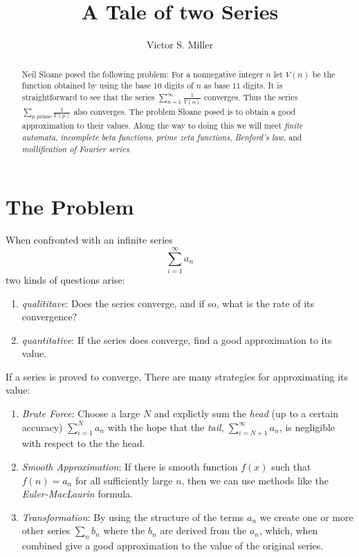 \documentclass{article}
\title{A Tale of two Series}
\author{Victor S. Miller}
\begin{document}
\maketitle
\begin{abstract}
  Neil Sloane posed the following problem: For a nonnegative integer
  $n$ let $V(n)$ be the function obtained by using the base 10 digits
  of $n$ as base 11 digits. It is straightforward to see that the
  series $\sum_{n=1}^\infty \frac{1}{V(n)}$ converges. Thus the series
  $\sum_{p \text{ prime}} \frac{1}{V(p)}$ also converges. The problem Sloane
  posed is to obtain a good approximation to their values.
  Along the way to doing this we will meet \emph{finite automata},
  \emph{incomplete beta functions}, \emph{prime zeta functions},
  \emph{Benford's law}, and \emph{mollification of Fourier series}.
\end{abstract}

\section{The Problem}
\label{sec:problem}

When confronted with an infinite series
$$\sum_{i=1}^\infty a_n$$
two kinds of questions arise:
\begin{enumerate}
\item \emph{qualititave}: Does the series converge, and if so, what
  is the rate of its convergence?
\item \emph{quantitative}: If the series
  does converge, find a good approximation to its value.
\end{enumerate}
If a series is proved to converge, There are many strategies for
approximating its value:

\begin{enumerate}
\item \emph{Brute Force}: Choose a large $N$ and explictly sum the
  \emph{head} (up to a
  certain accuracy) $\sum_{i=1}^N a_n$ with the hope that the
  \emph{tail}, $\sum_{i=N+1}^\infty a_n$, is negligible with respect to
  the the head.
\item \emph{Smooth Approximation}: If there is smooth function $f(x)$
  such that $f(n) = a_n$ for all sufficiently large $n$, then we can
  use methods like the \emph{Euler-MacLaurin} formula.
\item \emph{Transformation}: By using the structure of the terms $a_n$
  we create one or more other series $\sum_n b_n$ where the $b_n$ are derived
  from the $a_n$, which, when combined give a good approximation to
  the value of the original series.
\end{enumerate}
\end{document}
